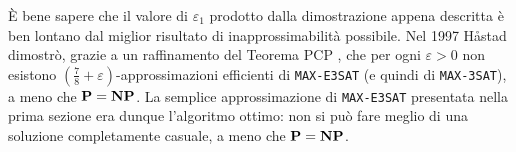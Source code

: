 È bene sapere che il valore di $\varepsilon_1$ prodotto dalla dimostrazione
appena descritta è ben lontano dal miglior risultato di inapprossimabilità
possibile. Nel 1997 Håstad dimostrò, grazie a un raffinamento del Teorema PCP
\cite{Has01}, che per ogni $\varepsilon > 0$ non esistono
$(\frac78 + \varepsilon)$-approssimazioni efficienti di \texttt{MAX-E3SAT} (e
quindi di \texttt{MAX-3SAT}), a meno che $\mathbf{P} = \mathbf{NP}$.
La semplice approssimazione di \texttt{MAX-E3SAT} presentata nella prima
sezione era dunque l'algoritmo ottimo: non si può fare meglio di una
soluzione completamente casuale, a meno che $\mathbf{P} = \mathbf{NP}$.
